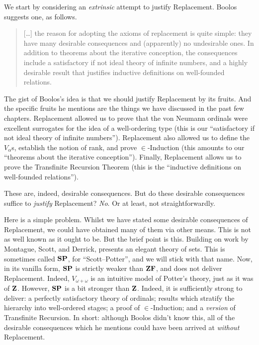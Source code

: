 \documentclass[../../../include/open-logic-section]{subfiles}
\begin{document}

We start by considering an \emph{extrinsic} attempt to justify
Replacement. Boolos suggests one, as follows. 
\begin{quote}
  [\ldots] the reason for adopting the axioms of replacement is quite
  simple: they have many desirable consequences and (apparently) no
  undesirable ones. In addition to theorems about the iterative
  conception, the consequences include a satisfactory if not ideal
  theory of infinite numbers, and a highly desirable result that
  justifies inductive definitions on well-founded relations.
  \citep[229]{Boolos1971}
\end{quote}		
The gist of Boolos's idea is that we should justify Replacement by its
fruits. And the specific fruits he mentions are the things we have
discussed in the past few chapters. Replacement allowed us to prove
that the von Neumann ordinals were excellent surrogates for the idea
of a well-ordering type (this is our ``satisfactory if not ideal
theory of infinite numbers''). Replacement also allowed us to define
the $V_\alpha$s, establish the notion of rank, and prove
$\in$-Induction (this amounts to our ``theorems about the iterative
conception''). Finally, Replacement allows us to prove the Transfinite
Recursion Theorem (this is the ``inductive definitions on well-founded
relations''). 

These are, indeed, desirable consequences. But do these desirable
consequences suffice to \emph{justify} Replacement? \emph{No}. Or at
least, not straightforwardly. 

Here is a simple problem. Whilst we have stated some desirable
consequences of Replacement, we could have obtained many of them via
other means. This is not as well known as it ought to be. But the
brief point is this. Building on work by Montague, Scott, and Derrick,
\cite{Potter2004} presents an elegant theory of sets. This is
sometimes called $\mathbf{SP}$, for ``Scott--Potter'', and we will stick with
that name. Now, in its vanilla form, $\mathbf{SP}$ is strictly weaker than
$\mathbf{ZF}$, and does not deliver Replacement. Indeed, $V_{\omega+\omega}$
is an intuitive model of Potter's theory, just as it was of $\mathbf{Z}$.
However, $\mathbf{SP}$ is a bit stronger than $\mathbf{Z}$. Indeed, it is sufficiently
strong to deliver: a perfectly satisfactory theory of ordinals;
results which stratify the hierarchy into well-ordered stages; a proof
of $\in$-Induction; and a \emph{version} of Transfinite Recursion. In
short: although Boolos didn't know this, all of the desirable
consequences which he mentions could have been arrived at
\emph{without} Replacement.
\end{document}
